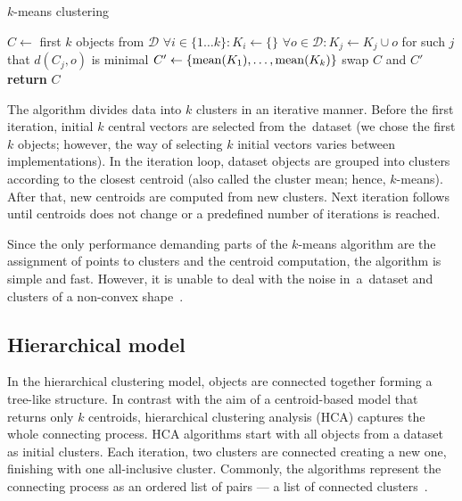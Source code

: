\begin{algorithm}[t]
	\caption{$k$-means clustering}
	\label{alg01:kmeans}
	\begin{algorithmic}[1]
		\State $C \gets$ first $k$ objects from  $\mathcal{D}$ 
		\Repeat
			\State $\forall i \in \{1\dots k\}:K_i \gets \{\}$  
			\State $\forall o \in \mathcal{D}:K_{j} \gets K_{j} \cup o$ for such $j$ that $d(C_j,o)$ is minimal 
			\State $C' \gets \{\operatorname{mean}(K_1),\dots,\operatorname{mean}(K_k)\}$
			\State swap $C$ and $C'$
		\State \textbf{return} $C$
		\EndProcedure
	\end{algorithmic}
\end{algorithm}


The algorithm divides data into $k$ clusters in an iterative manner. Before the first iteration, initial $k$ central vectors are selected from the~dataset (we chose the first $k$ objects; however, the way of selecting $k$ initial vectors varies between 
implementations). In the iteration loop, dataset objects are grouped into clusters according to the closest centroid (also called the cluster mean; hence, $k$-means). After that, new centroids are computed from new clusters. Next iteration follows until centroids does not change or a predefined number of iterations is reached. 

Since the only performance demanding parts of the $k$-means algorithm are the assignment of points to clusters and the centroid computation, the algorithm is simple and fast. However, it is unable to deal with the noise in~a~dataset and clusters of a non-convex shape~\cite{uppada2014centroid}.
  

\subsection{Hierarchical model}

In the hierarchical clustering model, objects are connected together forming a tree-like structure. In contrast with the aim of a centroid-based model that returns only $k$ centroids, hierarchical clustering analysis (HCA) captures the whole connecting process. HCA algorithms start with all objects from a dataset as initial clusters. Each iteration, two clusters are connected creating a new one, finishing with one all-inclusive cluster. Commonly, the algorithms represent the connecting process as an ordered list of pairs --- a list of connected clusters~\cite{karypis1999chameleon}.

